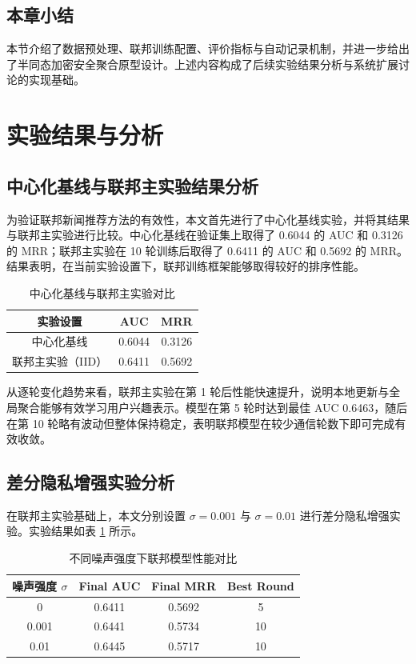 \documentclass[UTF8,a4paper,12pt]{ctexart}
\numberwithin{equation}{section}
\begin{document}
\subsection{本章小结}
本节介绍了数据预处理、联邦训练配置、评价指标与自动记录机制，并进一步给出了半同态加密安全聚合原型设计。上述内容构成了后续实验结果分析与系统扩展讨论的实现基础。

\newpage
{}
\section{实验结果与分析}
\subsection{中心化基线与联邦主实验结果分析}
为验证联邦新闻推荐方法的有效性，本文首先进行了中心化基线实验，并将其结果与联邦主实验进行比较。中心化基线在验证集上取得了 0.6044 的 AUC 和 0.3126 的 MRR；联邦主实验在 10 轮训练后取得了 0.6411 的 AUC 和 0.5692 的 MRR。结果表明，在当前实验设置下，联邦训练框架能够取得较好的排序性能。

\begin{table}[H]
\centering
\caption{中心化基线与联邦主实验对比}
\small
\begin{tabular}{ccc}
\toprule
实验设置 & AUC & MRR \\
\midrule
中心化基线 & 0.6044 & 0.3126 \\
联邦主实验（IID） & 0.6411 & 0.5692 \\
\bottomrule
\end{tabular}
\end{table}

从逐轮变化趋势来看，联邦主实验在第 1 轮后性能快速提升，说明本地更新与全局聚合能够有效学习用户兴趣表示。模型在第 5 轮时达到最佳 AUC 0.6463，随后在第 10 轮略有波动但整体保持稳定，表明联邦模型在较少通信轮数下即可完成有效收敛。

\subsection{差分隐私增强实验分析}
在联邦主实验基础上，本文分别设置 $\sigma=0.001$ 与 $\sigma=0.01$ 进行差分隐私增强实验。实验结果如表 \ref{tab:dp} 所示。

\begin{table}[H]
\centering
\caption{不同噪声强度下联邦模型性能对比}
\label{tab:dp}
\small
\begin{tabular}{cccc}
\toprule
噪声强度 $\sigma$ & Final AUC & Final MRR & Best Round \\
\midrule
0 & 0.6411 & 0.5692 & 5 \\
0.001 & 0.6441 & 0.5734 & 10 \\
0.01 & 0.6445 & 0.5717 & 10 \\
\bottomrule
\end{tabular}
\end{table}
\end{document}
